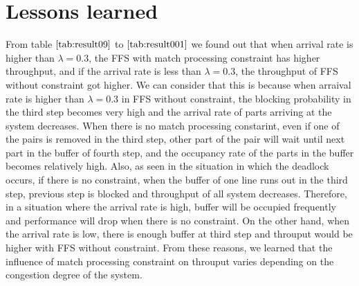 \section{Lessons learned}
From table $\ref{tab:result09}$ to $\ref{tab:result001}$ we found out that when arrival rate is higher than $\lambda = 0.3$, the FFS with match processing constraint has higher throughput, and if the arrival rate is less than $\lambda = 0.3$, the throughput of FFS without constraint got higher.
We can consider that this is because when arraival rate is higher than $\lambda =0.3$ in FFS without constraint, the blocking probability in the third step becomes very high and the arrival rate of parts arriving at the system decreases.
When there is no match processing constarint, even if one of the pairs is removed in the third step, other part of the pair will wait until next part in the buffer of fourth step, and the occupancy rate of the parts in the buffer becomes relatively high. 
Also, as seen in the situation in which the deadlock occurs, if there is no constraint, when the buffer of one line runs out in the third step, previous step is blocked and throughput of all system decreases.
Therefore, in a situation where the arrival rate is high, buffer will be occupied frequently and performance will drop when there is no constraint.
On the other hand, when the arrival rate is low, there is enough buffer at third step and throuput would be higher with FFS without constraint.
From these reasons, we learned that the influence of match processing constraint on throuput varies depending on the congestion degree of the system.